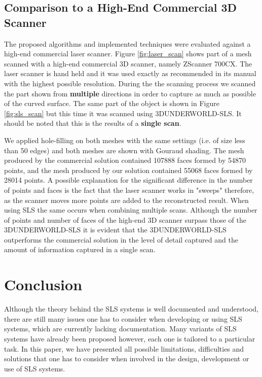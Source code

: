 \documentclass[final,12pt,3p]{elsarticle}
\begin{document}
\subsection{Comparison to a High-End Commercial 3D Scanner}
The proposed algorithms and implemented techniques were evaluated against a high-end commercial laser scanner. Figure \ref{fig:laser_scan} shows part of a mesh scanned with a high-end commercial 3D scanner, namely ZScanner 700CX. The laser scanner is hand held and it was used exactly as recommended in its manual with the highest possible resolution. During the the scanning process we scanned the part shown from \textbf{multiple} directions in order to capture as much as possible of the curved surface. The same part of the object is shown in Figure \ref{fig:sls_scan} but this time it was scanned using 3DUNDERWORLD-SLS. It should be noted that this is the results of a \textbf{single scan}. 

We applied hole-filling on both meshes with the same settings (i.e. of size less than 50 edges) and both meshes are shown with Gouraud shading. The mesh produced by the commercial solution contained 107888 faces formed by 54870 points, and the mesh produced by our solution contained 55068 faces formed by 28014 points. A possible explanation for the significant difference in the number of points and faces is the fact that the laser scanner works in "sweeps" therefore, as the scanner moves more points are added to the reconstructed result. When using SLS the same occurs when combining multiple scans. Although the number of points and number of faces of the high-end 3D scanner surpass those of the 3DUNDERWORLD-SLS it is evident that the 3DUNDERWORLD-SLS outperforms the commercial solution in the level of detail captured and the amount of information captured in a single scan. 

\section{Conclusion}
\label{sec:conclusion}
Although the theory behind the SLS systems is well documented and understood, there are still many issues one has to consider when developing or using SLS systems, which are currently lacking documentation. Many variants of SLS systems have already been proposed however, each one is tailored to a particular task. In this paper, we have presented all possible limitations, difficulties and solutions that one has to consider when involved in the design, development or use of SLS systems.
\end{document}
